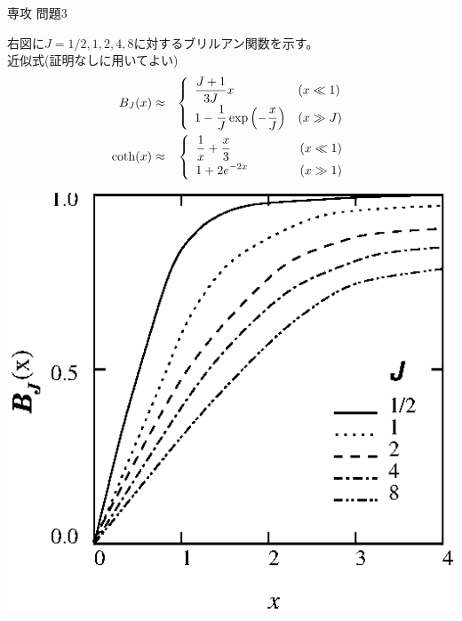 \documentclass[fleqn]{jbook}
\begin{document}
\begin{question}{専攻 問題3}{}
\begin{subquestions}
\begin{minipage}{90mm}
  右図に$J=1/2,1,2,4,8$に対するブリルアン関数を示す。\\
  近似式(証明なしに用いてよい)
  \begin{eqnarray*}
    B_J(x) &\approx& \left\{\begin{array}{ll}%
      \ds \frac{J+1}{3J}x &%
      (x\ll 1) \\[2mm]
      \ds 1-\frac{1}{J}\exp\left(-\frac{x}{J}\right) &%
      (x\gg J)%
    \end{array}\right.\\
%
    \coth(x) &\approx& \left\{\begin{array}{ll}%
      \ds \frac{1}{x}+\frac{x}{3}\quad\quad\quad\quad\;\;&
      (x\ll 1)\\[2mm]
      \ds 1+2e^{-2x} &
      (x\gg 1)%
    \end{array}\right.
  \end{eqnarray*}
\end{minipage}
\begin{minipage}{70mm}
  \begin{center}
    \mbox{\includegraphics[clip]{1994phy3-1.eps}}
  \end{center}
\end{minipage}


\end{subquestions}
\end{question}
\end{document}
